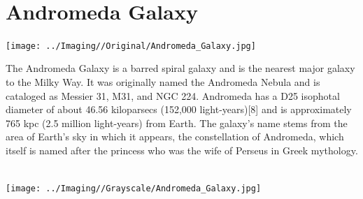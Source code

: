 \newpage\pagecolor{black}\color{white}
\ \\\section{Andromeda Galaxy}
\texttt{[image: ../Imaging//Original/Andromeda\_Galaxy.jpg]}
{\footnotesize\color{white}
The Andromeda Galaxy is a barred spiral galaxy and is the nearest major galaxy to the Milky Way. It was originally named the Andromeda Nebula and is cataloged as Messier 31, M31, and NGC 224. Andromeda has a D25 isophotal diameter of about 46.56 kiloparsecs (152,000 light-years)[8] and is approximately 765 kpc (2.5 million light-years) from Earth. The galaxy's name stems from the area of Earth's sky in which it appears, the constellation of Andromeda, which itself is named after the princess who was the wife of Perseus in Greek mythology. 


}\ \\
\texttt{[image: ../Imaging//Grayscale/Andromeda\_Galaxy.jpg]}
